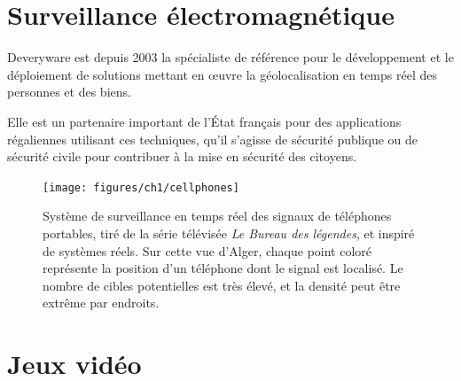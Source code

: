 \begin{appendices}
	


\section{Surveillance électromagnétique}
	\label{sub:deveryware}

	\begin{displayquote}
		Deveryware est depuis 2003 la spécialiste de référence pour le développement et le déploiement de solutions mettant en œuvre la géolocalisation en temps réel des personnes et des biens.

		Elle est un partenaire important de l'État français pour des applications régaliennes utilisant ces techniques, qu'il s'agisse de sécurité publique ou de sécurité civile pour contribuer à la mise en sécurité des citoyens.\footnotemark{}
	\end{displayquote}
	

	\begin{figure}[!htbp]
		\centering
		\texttt{[image: figures/ch1/cellphones]}
		\caption[Surveillance des signaux de téléphones portables]{Système de surveillance en temps réel des signaux de téléphones portables, tiré de la série télévisée \emph{Le Bureau des légendes}\footnotemark{}, et inspiré de systèmes réels. Sur cette vue d'Alger, chaque point coloré représente la position d'un téléphone dont le signal est localisé. Le nombre de cibles potentielles est très élevé, et la densité peut être extrême par endroits.}
		\label{fig:cellphones}
	\end{figure}
	


	


\section{Jeux vidéo}


\end{appendices}
